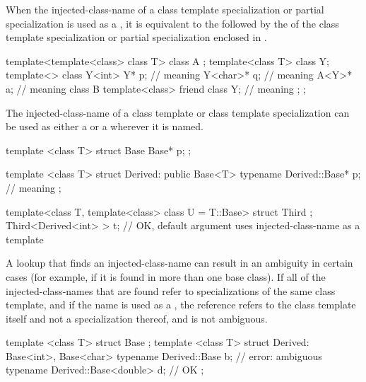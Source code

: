 \pnum
When the injected-class-name of a class template specialization or
partial specialization is used as a ,
it is equivalent to the  followed by the
of the class template specialization or partial
specialization enclosed in
\tcode{<>}.
\begin{example}
\begin{codeblock}
template<template<class> class T> class A { };
template<class T> class Y;
template<> class Y<int> {
  Y* p;                                 // meaning 
  Y<char>* q;                           // meaning 
  A<Y>* a;                              // meaning 
  class B {
    template<class> friend class Y;     // meaning 
  };
};
\end{codeblock}
\end{example}

\pnum
The injected-class-name of a class template or class
template specialization can be used as either
a  or a 
wherever it is named.
\begin{example}
\begin{codeblock}
template <class T> struct Base {
  Base* p;
};

template <class T> struct Derived: public Base<T> {
  typename Derived::Base* p;            // meaning 
};

template<class T, template<class> class U = T::Base> struct Third { };
Third<Derived<int> > t;                 // OK, default argument uses injected-class-name as a template
\end{codeblock}
\end{example}

\pnum
A lookup that finds an injected-class-name can result in an ambiguity in
certain cases (for example, if it is found in more than one
base class).
If all of the injected-class-names that are
found refer to specializations of the same class template,
and if the name
is used as a ,
the reference refers to the class template itself and not a
specialization thereof, and is not ambiguous.
\begin{example}
\begin{codeblock}
template <class T> struct Base { };
template <class T> struct Derived: Base<int>, Base<char> {
  typename Derived::Base b;             // error: ambiguous
  typename Derived::Base<double> d;     // OK
};
\end{codeblock}
\end{example}

